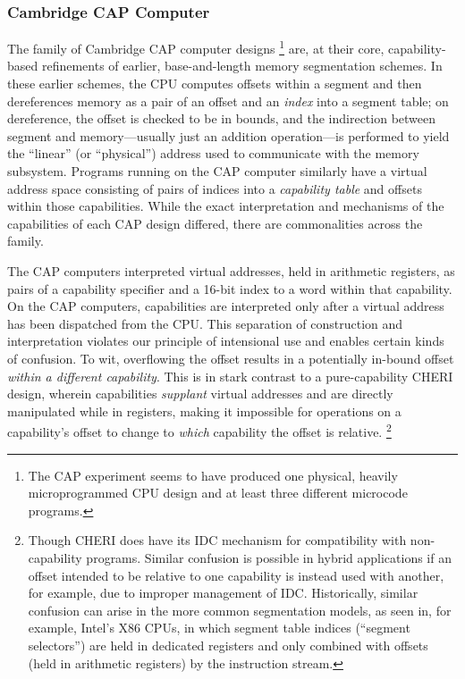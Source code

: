 \subsubsection{Cambridge CAP Computer} %

The family of Cambridge CAP computer designs%
%
\footnote{The CAP experiment seems to have produced one physical, heavily
microprogrammed CPU design and at least three different microcode programs.}
%
\cite{WilkesNeedham79}
%
are, at their core, capability-based refinements of earlier,
base-and-length memory segmentation schemes.  In these earlier schemes, the
CPU computes offsets within a segment and then dereferences memory as a pair
of an offset and an \emph{index} into a segment table; on dereference, the
offset is checked to be in bounds, and the indirection between segment and
memory---usually just an addition operation---is performed to yield the
``linear'' (or ``physical'') address used to communicate with the memory
subsystem.  Programs running on the CAP computer similarly have a virtual
address space consisting of pairs of indices into a \emph{capability table}
and offsets within those capabilities.  While the exact interpretation and
mechanisms of the capabilities of each CAP design differed, there are
commonalities across the family.

The CAP computers interpreted virtual addresses, held in arithmetic
registers, as pairs of a capability specifier and a 16-bit index to a word
within that capability.  On the CAP computers, capabilities are interpreted
only after a virtual address has been dispatched from the CPU.  This
separation of construction and interpretation violates our principle of
intensional use and enables certain kinds of confusion.  To wit, overflowing
the offset results in a potentially in-bound offset \emph{within a different
capability}.  This is in stark contrast to a pure-capability CHERI design,
wherein capabilities \emph{supplant} virtual addresses and are directly
manipulated while in registers, making it impossible for operations on a
capability's offset to change to \emph{which} capability the offset is
relative.%
%
\footnote{Though CHERI does have its IDC mechanism for compatibility with
non-capability programs.  Similar confusion is possible in hybrid
applications if an offset intended to be relative to one capability is
instead used with another, for example, due to improper management of IDC.
Historically, similar confusion can arise in the more common segmentation
models, as seen in, for example, Intel's X86 CPUs, in which segment table
indices (``segment selectors'') are held in dedicated registers and only
combined with offsets (held in arithmetic registers) by the instruction
stream.}

